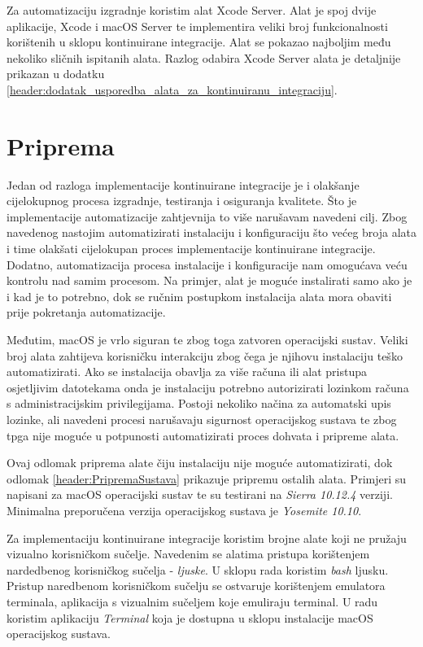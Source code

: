 \documentclass[times, utf8, diplomski, numeric]{fer}
\begin{document}
Za automatizaciju izgradnje koristim alat Xcode Server. Alat je spoj dvije aplikacije, Xcode i macOS Server te implementira veliki broj funkcionalnosti korištenih u sklopu kontinuirane integracije. Alat se pokazao najboljim među nekoliko sličnih ispitanih alata. Razlog odabira Xcode Server alata je detaljnije prikazan u dodatku \ref{header:dodatak_usporedba_alata_za_kontinuiranu_integraciju}.

\section{Priprema}

Jedan od razloga implementacije kontinuirane integracije je i olakšanje cijelokupnog procesa izgradnje, testiranja i osiguranja kvalitete. Što je implementacije automatizacije zahtjevnija to više narušavam navedeni cilj. Zbog navedenog nastojim automatizirati instalaciju i konfiguraciju što većeg broja alata i time olakšati cijelokupan proces implementacije kontinuirane integracije. Dodatno, automatizacija procesa instalacije i konfiguracije nam omogućava veću kontrolu nad samim procesom. Na primjer, alat je moguće instalirati samo ako je i kad je to potrebno, dok se ručnim postupkom instalacija alata mora obaviti prije pokretanja automatizacije.

Međutim, macOS je vrlo siguran te zbog toga zatvoren operacijski sustav. Veliki broj alata zahtijeva korisničku interakciju zbog čega je njihovu instalaciju teško automatizirati. Ako se instalacija obavlja za više računa ili alat pristupa osjetljivim datotekama onda je instalaciju potrebno autorizirati lozinkom računa s administracijskim privilegijama. Postoji nekoliko načina za automatski upis lozinke, ali navedeni procesi narušavaju sigurnost operacijskog sustava te zbog tpga nije moguće u potpunosti automatizirati proces dohvata i pripreme alata.

Ovaj odlomak priprema alate čiju instalaciju nije moguće automatizirati, dok odlomak \ref{header:PripremaSustava} prikazuje pripremu ostalih alata. Primjeri su napisani za macOS operacijski sustav te su testirani na \textit{Sierra 10.12.4} verziji. Minimalna preporučena verzija operacijskog sustava je \textit{Yosemite 10.10}.

Za implementaciju kontinuirane integracije koristim brojne alate koji ne pružaju vizualno korisničkom sučelje. Navedenim se alatima pristupa korištenjem nardedbenog korisničkog sučelja - \textit{ljuske}. U sklopu rada koristim \textit{bash} ljusku. Pristup naredbenom korisničkom sučelju se ostvaruje korištenjem emulatora terminala, aplikacija s vizualnim sučeljem koje emuliraju terminal. U radu koristim aplikaciju \textit{Terminal} koja je dostupna u sklopu instalacije macOS operacijskog sustava.
\end{document}
